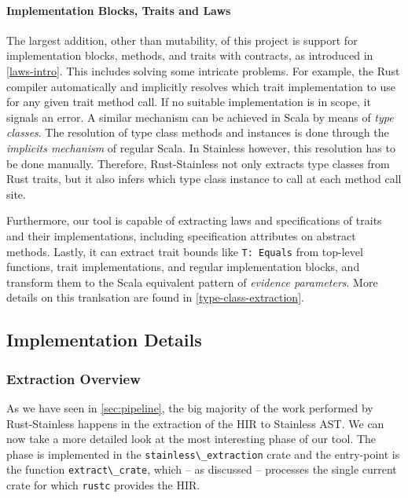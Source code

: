 \paragraph{Implementation Blocks, Traits and Laws}

The largest addition, other than mutability, of this project is support for
implementation blocks, methods, and traits with contracts, as introduced in
\autoref{laws-intro}. This includes solving some intricate problems. For
example, the Rust compiler automatically and implicitly resolves which trait
implementation to use for any given trait method call. If no suitable
implementation is in scope, it signals an error.  A similar mechanism can be
achieved in Scala by means of \emph{type classes}. The resolution of type class
methods and instances is done through the \emph{implicits mechanism} of regular
Scala. In Stainless however, this resolution has to be done manually. Therefore,
Rust-Stainless not only extracts type classes from Rust traits, but it also
infers which type class instance to call at each method call site.

Furthermore, our tool is capable of extracting laws and specifications of traits
and their implementations, including specification attributes on abstract
methods. Lastly, it can extract  trait bounds like \passthrough{\lstinline!T:
Equals!} from top-level functions, trait implementations, and regular
implementation blocks, and transform them to the Scala equivalent pattern of
\emph{evidence parameters}. More details on this tranlsation are found in
\autoref{type-class-extraction}.



\subsection{Implementation Details}

\subsubsection{Extraction Overview}
\label{sec:extraction-overview}

As we have seen in \autoref{sec:pipeline}, the big majority of the work
performed by Rust-Stainless happens in the extraction of the HIR to
Stainless AST. We can now take a more detailed look at the most
interesting phase of our tool. The phase is implemented in the
\passthrough{\lstinline!stainless\_extraction!} crate and the
entry-point is the function \passthrough{\lstinline!extract\_crate!},
which -- as discussed -- processes the single current crate for which
\passthrough{\lstinline!rustc!} provides the HIR.

